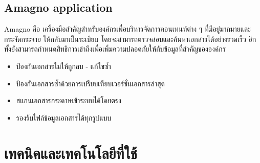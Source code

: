 \documentclass[12pt,oneside,openright,a4paper]{cpe-thai-project}
\begin{document}
\subsection{Amagno application}
\hspace*{1cm} Amagno คือ เครื่องมือสำคัญสำหรับองค์กรเพื่อบริหารจัดการคอนเทนท์ต่าง ๆ ที่มีอยู่มากมายและกระจัดกระจาย ให้กลับมาเป็นระเบียบ โดยจะสามารถตรวจสอบและค้นหาเอกสารได้อย่างรวดเร็ว อีกทั้งยังสามารถกำหนดสิทธิการเข้าถึงเพื่อเพิ่มความปลอดภัยให้กับข้อมูลที่สำคัญขององค์กร \\
\begin{itemize}
  \item ป้องกันเอกสารไม่ให้ถูกลบ - แก้ไขซ้ำ
  \item ป้องกันเอกสารซ้ำด้วยการเปรียบเทียบเวอร์ชั่นเอกสารล่าสุด
  \item สแกนเอกสารกระดาษเข้าระบบได้โดยตรง
  \item รองรับไฟล์ข้อมูลเอกสารได้ทุกรูปแบบ
\end{itemize}

\section{เทคนิคและเทคโนโลยีที่ใช้}
\end{document}
